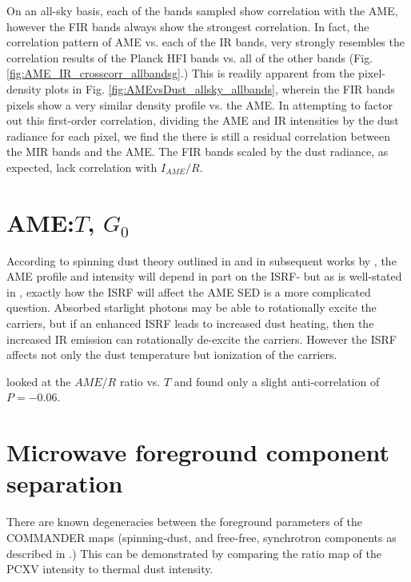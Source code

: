        On an all-sky basis, each of the bands sampled show correlation with the AME, however the FIR bands always show the strongest correlation. In fact, the correlation pattern of AME vs. each of the IR bands, very strongly resembles the correlation results of the Planck HFI bands vs. all of the other bands (Fig. \ref{fig:AME_IR_crosscorr_allbandsg}.) This is readily apparent from the pixel-density plots in Fig. \ref{fig:AMEvsDust_allsky_allbands}, wherein the FIR bands pixels show a very similar density profile vs. the AME. In attempting to factor out this first-order correlation, dividing the AME and IR intensities by the dust radiance for each pixel, we find the there is still a residual correlation between the MIR bands and the AME. The FIR bands scaled by the dust radiance, as expected, lack correlation with $I_{AME}/R$.


      \section{AME:$T$, $G_{0}$}

        According to spinning dust theory outlined in \cite{draine98a} and in subsequent works by \cite{ysard10a}, the AME profile and intensity will depend in part on the ISRF- but as is well-stated in \cite{hensley17a}, exactly how the ISRF will affect the AME SED is a more complicated question. Absorbed starlight photons may be able to rotationally excite the carriers, but if an enhanced ISRF leads to increased dust heating, then the increased IR emission can rotationally de-excite the carriers. However the ISRF affects not only the dust temperature but ionization of the carriers.

        \cite{hensley16} looked at the $AME$/$R$ ratio vs. $T$ and found only a slight anti-correlation of $P = -0.06$.

      \section{Microwave foreground component separation}

        There are known degeneracies between the foreground parameters of the COMMANDER maps (spinning-dust, and free-free, synchrotron components as described in \cite{planck15X}.) This can be demonstrated by comparing the ratio map of the PCXV intensity to thermal dust intensity.
